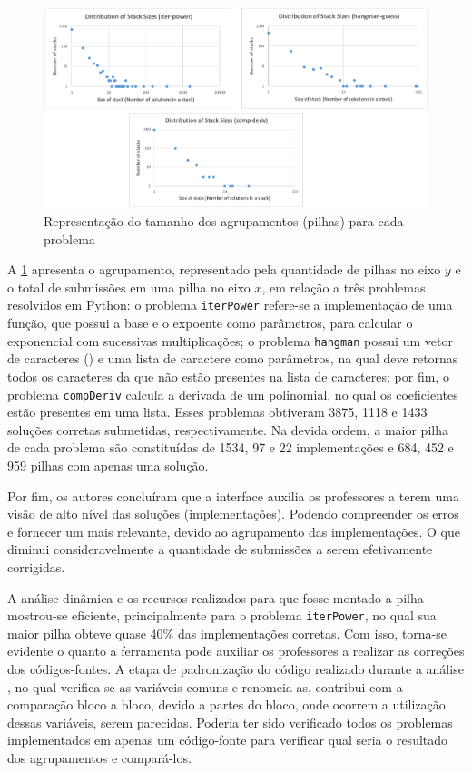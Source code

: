 		\begin{figure}[h]
			\centering
			\includegraphics[width=1\linewidth]{imagem/OverCodeDistri}
			\caption{Representação do tamanho dos agrupamentos (pilhas) para cada problema
				\cite{Glassman:2015}}
			\label{fig:OverCodeDistri}
		\end{figure}

		A \cref{fig:OverCodeDistri} apresenta o agrupamento, representado pela quantidade de
		pilhas no eixo $y$ e o total de submissões em uma pilha no eixo $x$,  em relação a
		três problemas resolvidos em Python: o problema \texttt{iterPower} refere-se a
		implementação de uma função, que possui a base e o expoente como parâmetros, para
		calcular o exponencial com sucessivas multiplicações; o problema \texttt{hangman}
		possui um vetor de caracteres () e uma lista de caractere como
		parâmetros, na qual deve retornas todos os caracteres da  que não
		estão presentes na lista de caracteres; por fim, o problema \texttt{compDeriv}
		calcula a derivada de um polinomial, no qual os coeficientes estão presentes em
		uma lista. Esses problemas obtiveram 3875, 1118 e 1433 soluções corretas submetidas,
		respectivamente. Na devida ordem, a maior pilha de cada problema são constituídas
		de 1534, 97 e 22 implementações e 684, 452 e 959 pilhas com apenas uma solução.

	    Por fim, os autores concluíram que a interface auxilia os professores a terem
	    uma visão de alto nível das soluções (implementações). Podendo compreender os
	    erros e fornecer um  mais relevante, devido ao agrupamento
	    das implementações. O que diminui consideravelmente a quantidade de submissões
	    a serem efetivamente corrigidas.
	    
		A análise dinâmica e os recursos realizados para que fosse montado a pilha
		mostrou-se eficiente, principalmente para o problema \texttt{iterPower}, no
		qual sua maior pilha obteve quase 40\% das implementações corretas. Com isso,
		torna-se evidente o quanto a ferramenta pode auxiliar os professores a realizar
		as correções dos códigos-fontes. A etapa de padronização do código realizado
		durante a análise , no qual verifica-se as variáveis comuns
		e renomeia-as, contribui com a comparação bloco a bloco, devido a partes do bloco,
		onde ocorrem a utilização dessas variáveis, serem parecidas. Poderia ter sido
		verificado todos os problemas implementados em apenas um código-fonte para
		verificar qual seria o resultado dos agrupamentos e compará-los.
	    
